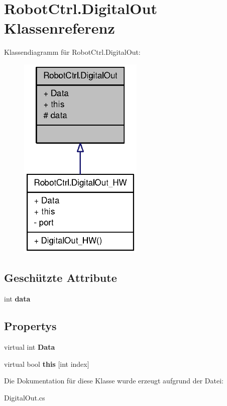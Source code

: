 \hypertarget{class_robot_ctrl_1_1_digital_out}{
\section{RobotCtrl.DigitalOut Klassenreferenz}
\label{class_robot_ctrl_1_1_digital_out}
}


Klassendiagramm für RobotCtrl.DigitalOut:\nopagebreak
\begin{figure}[H]
\begin{center}
\leavevmode
\includegraphics[width=168pt]{class_robot_ctrl_1_1_digital_out__inherit__graph}
\end{center}
\end{figure}
\subsection*{Geschützte Attribute}
\begin{DoxyCompactItemize}
\item 
\hypertarget{class_robot_ctrl_1_1_digital_out_aefd56fa4fcdd5ba7eb3f34545cc090a6}{
int {\bfseries data}}
\label{class_robot_ctrl_1_1_digital_out_aefd56fa4fcdd5ba7eb3f34545cc090a6}

\end{DoxyCompactItemize}
\subsection*{Propertys}
\begin{DoxyCompactItemize}
\item 
\hypertarget{class_robot_ctrl_1_1_digital_out_a4c85a4bab149666840e9a551f62b6305}{
virtual int {\bfseries Data}}
\label{class_robot_ctrl_1_1_digital_out_a4c85a4bab149666840e9a551f62b6305}

\item 
\hypertarget{class_robot_ctrl_1_1_digital_out_a4f57b73a7591bb053e7025eebb26d577}{
virtual bool {\bfseries this} \mbox{[}int index\mbox{]}}
\label{class_robot_ctrl_1_1_digital_out_a4f57b73a7591bb053e7025eebb26d577}

\end{DoxyCompactItemize}


Die Dokumentation für diese Klasse wurde erzeugt aufgrund der Datei:\begin{DoxyCompactItemize}
\item 
DigitalOut.cs\end{DoxyCompactItemize}
